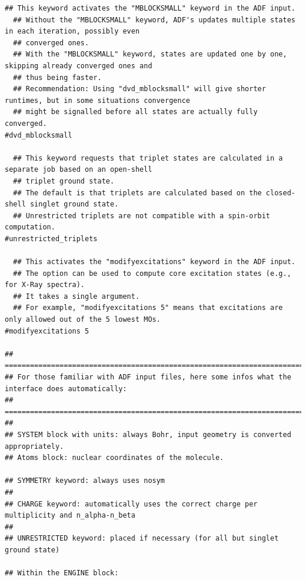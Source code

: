 \documentclass[a4paper,11pt,DIV=15,openany]{scrbook}
\begin{document}
\begin{oframed}
\begin{Verbatim}[commandchars=\\\{\}]
  ## This keyword activates the "MBLOCKSMALL" keyword in the ADF input.
  ## Without the "MBLOCKSMALL" keyword, ADF's updates multiple states in each iteration, possibly even 
  ## converged ones.
  ## With the "MBLOCKSMALL" keyword, states are updated one by one, skipping already converged ones and 
  ## thus being faster.
  ## Recommendation: Using "dvd_mblocksmall" will give shorter runtimes, but in some situations convergence 
  ## might be signalled before all states are actually fully converged.
#dvd_mblocksmall

  ## This keyword requests that triplet states are calculated in a separate job based on an open-shell 
  ## triplet ground state.
  ## The default is that triplets are calculated based on the closed-shell singlet ground state.
  ## Unrestricted triplets are not compatible with a spin-orbit computation.
#unrestricted_triplets

  ## This activates the "modifyexcitations" keyword in the ADF input.
  ## The option can be used to compute core excitation states (e.g., for X-Ray spectra).
  ## It takes a single argument.
  ## For example, "modifyexcitations 5" means that excitations are only allowed out of the 5 lowest MOs.
#modifyexcitations 5

## ===============================================================================================
## For those familiar with ADF input files, here some infos what the interface does automatically:
## ===============================================================================================
##
## SYSTEM block with units: always Bohr, input geometry is converted appropriately.
## Atoms block: nuclear coordinates of the molecule.

## SYMMETRY keyword: always uses nosym
##
## CHARGE keyword: automatically uses the correct charge per multiplicity and n_alpha-n_beta
##
## UNRESTRICTED keyword: placed if necessary (for all but singlet ground state)

## Within the ENGINE block:


\end{Verbatim}
\end{oframed}
\end{document}
